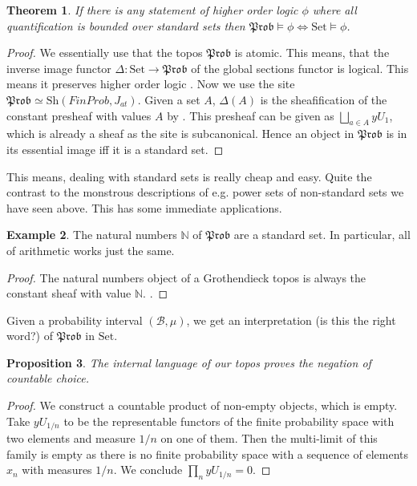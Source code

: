 \documentclass[a4paper]{amsproc}
\theoremstyle{plain}
\newtheorem{theorem}{Theorem}[section]
\newtheorem{proposition}[theorem]{Proposition}
\theoremstyle{definition}
\newtheorem{example}[theorem]{Example}
\theoremstyle{remark}
\numberwithin{equation}{section}
\begin{document}
\begin{theorem} If there is any statement of higher order logic $\phi$ where all quantification is bounded over \emph{standard} sets then $\mathfrak{Prob}\vDash \phi \iff \text{Set}\vDash \phi$.
\end{theorem}
\begin{proof}
We essentially use that the topos $\mathfrak{Prob}$ is atomic. This means, that the inverse image functor $\Delta: \text{Set}\rightarrow \mathfrak{Prob}$ of the global sections functor is logical. This means it preserves higher order logic \cite{XYZ}. Now we use the site $\mathfrak{Prob}\simeq \text{Sh}(FinProb,J_{at})$. Given a set $A$, $\Delta(A)$ is the sheafification of the constant presheaf with values $A$ by \cite{XYZ}. This presheaf can be given as $\bigsqcup_{a\in A}yU_1$, which is already a sheaf as the site is subcanonical.
Hence an object in $\mathfrak{Prob}$ is in its essential image iff it is a standard set. 
\end{proof}
This means, dealing with standard sets is really cheap and easy. Quite the contrast to the monstrous descriptions of e.g. power sets of non-standard sets we have seen above. This has some immediate applications.
\begin{example} The natural numbers $\mathbb{N}$ of $\mathfrak{Prob}$ are a standard set. In particular, all of arithmetic works just the same. %
\end{example}
\begin{proof}
The natural numbers object of a Grothendieck topos is always the constant sheaf with value $\mathbb{N}$. \cite{XYZ}.
\end{proof}
Given a probability interval $(\mathcal{B},\mu)$, we get an interpretation (is this the right word?) of $\mathfrak{Prob}$ in $\text{Set}$. %
\begin{proposition} The internal language of our topos proves the negation of countable choice.
\end{proposition}
\begin{proof} We construct a countable product of non-empty objects, which is empty. Take $yU_{1/n}$ to be the representable functors of the finite probability space with two elements and measure $1/n$ on one of them. Then the multi-limit of this family is empty as there is no finite probability space with a sequence of elements $x_n$ with measures $1/n$. We conclude $\prod_n yU_{1/n}=0$.
\end{proof}
\end{document}
